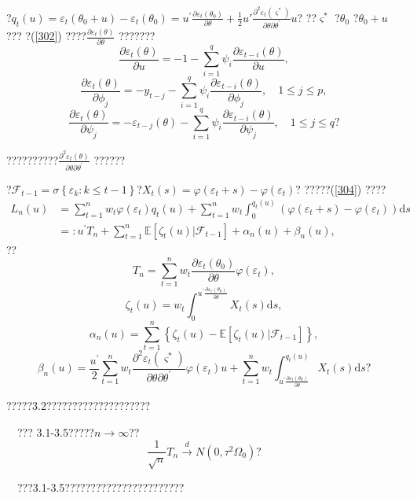 \documentclass[a4paper,12pt,openany,oneside,utf-8]{ctexbook}
\newcommand{\xiaosihao}{\fontsize{12pt}{\baselineskip}\selectfont}
\begin{document}
	?$q_t(u)=\varepsilon_t(\theta_0+u)-\varepsilon_t(\theta_0)=u^{\prime}\frac{\partial\varepsilon_t(\theta_0)}{\partial\theta}+\frac{1}{2}u{'}\frac{\partial^2\varepsilon_t(\varsigma^\ast)}{\partial\theta\partial\theta^{\prime}}u$?
	??$\varsigma^\ast$ ?$\theta_0$ ?$\theta_0+u$ ???
	?(\ref{302}) ????$\frac{\partial\varepsilon_t(\theta)}{\partial\theta}$ ???????
	$$\frac{\partial\varepsilon_t(\theta)}{\partial u}=-1-\sum_{i=1}^q\psi_i\frac{\partial\varepsilon_{t-i}(\theta)}{\partial u},$$
	$$\frac{\partial\varepsilon_t(\theta)}{\partial\phi_j}=-y_{t-j}-\sum_{i=1}^q\psi_i\frac{\partial\varepsilon_{t-i}(\theta)}{\partial\phi_j},\quad 1\le j\le p,$$
	$$\frac{\partial\varepsilon_t(\theta)}{\partial\psi_j}=-\varepsilon_{t-j}(\theta)-\sum_{i=1}^q\psi_i\frac{\partial\varepsilon_{t-i}(\theta)}{\partial\psi_j},\quad 1\le j\le q \mbox{?}$$
	
	??????????$\frac{\partial^2\varepsilon_t(\theta)}{\partial\theta\partial\theta^{\prime}}$ ??????
	
	?$\mathcal{F}_{t-1}=\sigma\left\{\varepsilon_k:k\le t-1\right\}$?$X_t(s)=\varphi(\varepsilon_t+s)-\varphi(\varepsilon_t)$? ?????(\ref{304}) ????
	\begin{align}\label{305}
		L_n(u)&=\sum_{t=1}^nw_t\varphi(\varepsilon_t)q_t(u)+\sum_{t=1}^nw_t\int_0^{q_t(u)}\left(\varphi(\varepsilon_t+s)-\varphi(\varepsilon_t)\right)\mathrm{d}s \nonumber \\
		&=:u^{\prime}T_n+\sum_{t=1}^n\mathbb{E}[\zeta_t(u)|\mathcal{F}_{t-1}]+\alpha_n(u)+\beta_n(u),
	\end{align}
	??
	$$T_n=\sum_{t=1}^nw_t\frac{\partial\varepsilon_t(\theta_0)}{\partial\theta}\varphi(\varepsilon_t),$$
	$$\zeta_t(u)=w_t\int_0^{u^{\prime}\frac{\partial\varepsilon_t(\theta_0)}{\partial\theta}}X_t(s)\mathrm{d}s,$$
	$$\alpha_n(u)=\sum_{t=1}^n\left\{\zeta_t(u)-\mathbb{E}\left[\zeta_t(u)|\mathcal{F}_{t-1}\right]\right\},$$
	$$\beta_n(u)=\frac{u^{\prime}}{2}\sum_{t=1}^nw_t\frac{\partial^2\varepsilon_t(\varsigma^\ast)}{\partial\theta\partial\theta^{\prime}}\varphi(\varepsilon_t)u+\sum_{t=1}^nw_t\int_{u^{\prime}\frac{\partial\varepsilon_t(\theta_0)}{\partial\theta}}^{q_t(u)}X_t(s)\mathrm{d}s\mbox{?}$$
	
	?????3.2????????????????????
	
	\noindent{\xiaosihao\heiti ??~3.3}~~??? 3.1-3.5?????$n\to\infty$??$$\frac{1}{\sqrt{n}}T_n\stackrel{d}{\rightarrow}N(0,\tau^2\Omega_0)\mbox{?}$$
	
	\noindent{\xiaosihao\heiti ??~3.3??}~~???3.1-3.5???????????????????????
	
\end{document}
